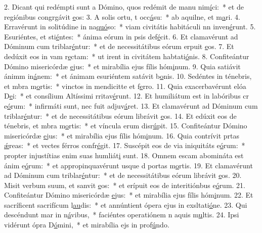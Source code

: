 2. Dicant qui redémpti sunt a Dómino, quos redémit de manu nim\uline{í}ci:~* et de regiónibus congrgávit \uline{e}os:
3. A solis ortu, t occ\uline{á}su:~* ab aquilne, et m\uline{a}ri.
4. Erravérunt in solitúdine in na\uline{quó}so:~* viam civitátis habitáculi nn inven\uline{é}runt.
5. Esuriéntes, et sti\uline{é}ntes:~* ánima eórum in psis def\uline{é}cit.
6. Et clamavérunt ad Dóminum cum triblar\uline{é}ntur:~* et de necessitátibus eórum erpuit \uline{e}os.
7. Et dedúxit eos in vam r\uline{e}ctam:~* ut irent in civitátem habtati\uline{ó}nis.
8. Confiteántur Dómino misericórdæ \uline{e}jus:~* et mirabília ejus fílis hóm\uline{i}num.
9. Quia satiávit ánimm in\uline{á}nem:~* et ánimam esuriéntem satávit b\uline{o}nis.
10. Sedéntes in ténebris, et mbra m\uline{o}rtis:~* vinctos in mendicitte et f\uline{e}rro.
11. Quia exacerbavérunt elóa D\uline{e}i:~* et consílium Altíssimi rritav\uline{é}runt.
12. Et humiliátum est in labóribus cr e\uline{ó}rum:~* infirmáti sunt, nec fuit  adjuv\uline{á}ret.
13. Et clamavérunt ad Dóminum cum triblar\uline{é}ntur:~* et de necessitátibus eórum librávit \uline{e}os.
14. Et edúxit eos de ténebris, et mbra m\uline{o}rtis:~* et víncula erum disr\uline{ú}pit.
15. Confiteántur Dómino misericórdæ \uline{e}jus:~* et mirabília ejus fílis hóm\uline{i}num.
16. Quia contrívit prtas \uline{ǽ}reas:~* et vectes férros confr\uline{é}git.
17. Suscépit eos de via iniquitáts e\uline{ó}rum:~* propter injustítias enim suas humliát\uline{i} sunt.
18. Omnem escam abomináta est ánim e\uline{ó}rum:~* et appropinquavérunt usque d portas m\uline{o}rtis.
19. Et clamavérunt ad Dóminum cum triblar\uline{é}ntur:~* et de necessitátibus eórum librávit \uline{e}os.
20. Misit verbum suum, et sanvit \uline{e}os:~* et erípuit eos de interitiónbus e\uline{ó}rum.
21. Confiteántur Dómino misericórdæ \uline{e}jus:~* et mirabília ejus fílis hóm\uline{i}num.
22. Et sacríficent sacrifícum l\uline{au}dis:~* et annúntient ópera ejus in exsltati\uline{ó}ne.
23. Qui descéndunt mar in n\uline{á}vibus,~* faciéntes operatiónem n aquis m\uline{u}ltis.
24. Ipsi vidérunt ópra D\uline{ó}mini,~* et mirabília ejs in prof\uline{ú}ndo.
